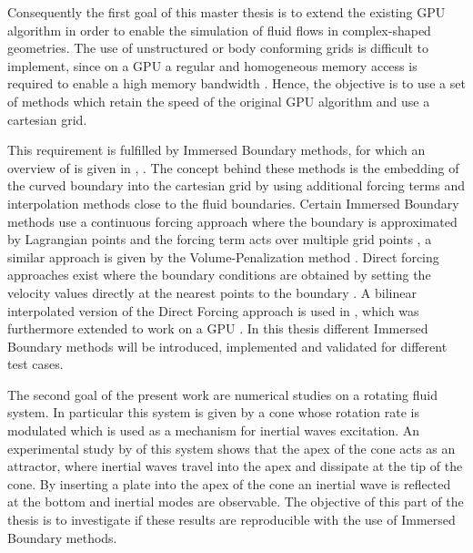 \bigbreak

Consequently the first goal of this master thesis is to extend the existing GPU algorithm
in order to enable the simulation of fluid flows in complex-shaped geometries.
The use of unstructured or body conforming grids is difficult to implement,
since on a GPU a regular and homogeneous memory access is required to enable a high memory bandwidth \citep{CUDABP}.
Hence, the objective is to use a set of methods which retain the speed of the original GPU algorithm and use a cartesian grid.

This requirement is fulfilled by Immersed Boundary methods, for which an
 overview of is given in \citep{Mittal2005}, \citep{Gornak2013}.
The concept behind these methods is the embedding of the curved boundary into the cartesian grid
by using additional forcing terms and interpolation methods close to the fluid boundaries.
Certain Immersed Boundary methods use a continuous forcing approach where the boundary is approximated by Lagrangian points
and the forcing term acts over multiple grid points \citep{Mittal2005},
a similar approach is given by the Volume-Penalization method \citep{Lulff2011}.
Direct forcing approaches exist where the boundary conditions are obtained by setting the
velocity values directly at the nearest points to the boundary \citep{Fadlun2000}.
A bilinear interpolated version of the Direct Forcing approach is used in \citep{Gornak2013},
which was furthermore extended to work on a GPU \citep{DeLeon2012}.
In this thesis different Immersed Boundary methods will be introduced, implemented and
validated for different test cases.

\bigbreak

The second goal of the present work are numerical studies on a rotating fluid system.
In particular this system is given by a cone whose rotation rate is modulated which is used as a mechanism for inertial waves excitation.
An experimental study by  \citeauthor{Beardsley1970} \citep{Beardsley1970} of this system shows that the apex of the cone acts as an attractor,
where inertial waves travel into the apex and dissipate at the tip of the cone.
By inserting a plate into the apex of the cone an inertial wave is reflected at the bottom and inertial modes are observable.
The objective of this part of the thesis is to investigate if these results
are reproducible with the use of Immersed Boundary methods.

\bigbreak

